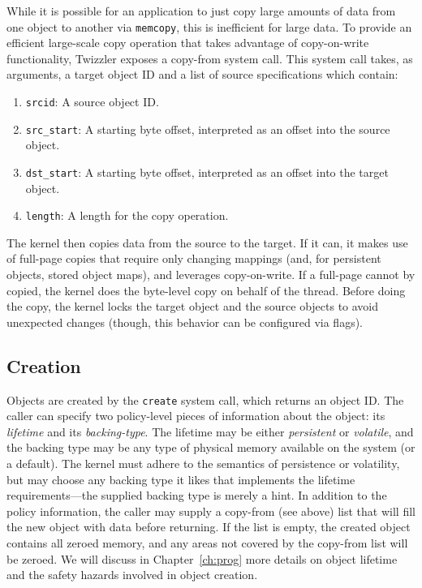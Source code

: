 While it is possible for an application to just copy large amounts of data from one object to another via
\texttt{memcopy}, this is inefficient for large data. To provide
an efficient large-scale copy operation that takes advantage of copy-on-write functionality, Twizzler exposes a
copy-from system call. This system call takes, as arguments, a target object ID and a list of source specifications
which contain:

\begin{enumerate}
    \item \texttt{srcid}: A source object ID.
    \item \texttt{src\_start}: A starting byte offset, interpreted as an offset into the source object.
    \item \texttt{dst\_start}: A starting byte offset, interpreted as an offset into the target object.
    \item \texttt{length}: A length for the copy operation.
\end{enumerate}

The kernel then copies data from the source to the target. If it can, it makes use of full-page copies that require only
changing mappings (and, for persistent objects, stored object maps), and leverages copy-on-write. If a full-page cannot
by copied, the kernel does the byte-level copy on behalf of the thread. Before doing the copy, the kernel locks the
target object and the source objects to avoid unexpected changes (though, this behavior can be configured via flags).

\subsection{Creation}

Objects are created by the \texttt{create} system call, which
returns an object ID\@. The caller can specify two policy-level pieces of information about the object: its
\emph{lifetime} and its \emph{backing-type}. The lifetime may be either \emph{persistent} or \emph{volatile}, and the
backing type may be any type of physical memory available on the system (or a default). The kernel must adhere to the
semantics of persistence or volatility, but may choose any backing type it likes that implements the lifetime
requirements---the supplied
backing type is merely a hint. In addition to the policy information, the caller may supply a copy-from (see above) list
that will fill the new object with data before returning. If the list is empty, the created object contains all zeroed
memory, and any areas not covered by the copy-from list will be zeroed.
We will discuss in Chapter~\ref{ch:prog} more details on object lifetime and the safety hazards involved in object
creation.

